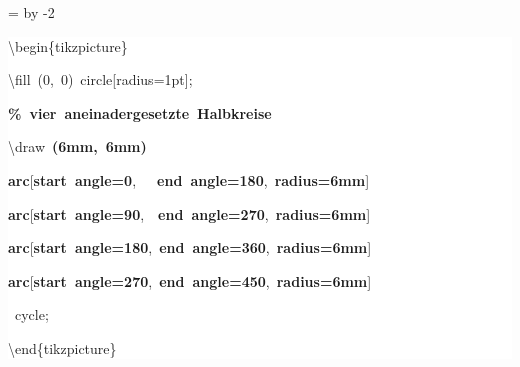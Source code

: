 \begingroup
\ttfamily
{}
=\textwidth
\advance{} by -2\fboxsep
\noindent
\colorbox{background}
{%
\parbox{\dimen255}
{%
\rule[-0.5ex]{0pt}{2.5ex}\hspace*{0.0em}\textbackslash{}begin\{tikzpicture\}\\
\rule[-0.5ex]{0pt}{2.5ex}\hspace*{1.0em}\textbackslash{}fill~(0,~0)~circle[radius=1pt];\\
\rule[-0.5ex]{0pt}{2.5ex}\hspace*{1.0em}\textcolor{G}{\textbf{\%~vier~aneinadergesetzte~Halbkreise}}\\
\rule[-0.5ex]{0pt}{2.5ex}\hspace*{1.0em}\textbackslash{}draw~\textcolor{R}{\textbf{(6mm,~6mm)}}\\
\rule[-0.5ex]{0pt}{2.5ex}\hspace*{4.0em}\textcolor{R}{\textbf{arc}}[\textcolor{R}{\textbf{start~angle=0}},~~~\textcolor{R}{\textbf{end~angle=180}},~\textcolor{R}{\textbf{radius=6mm}}]\\
\rule[-0.5ex]{0pt}{2.5ex}\hspace*{4.0em}\textcolor{R}{\textbf{arc}}[\textcolor{R}{\textbf{start~angle=90}},~~\textcolor{R}{\textbf{end~angle=270}},~\textcolor{R}{\textbf{radius=6mm}}]\\
\rule[-0.5ex]{0pt}{2.5ex}\hspace*{4.0em}\textcolor{R}{\textbf{arc}}[\textcolor{R}{\textbf{start~angle=180}},~\textcolor{R}{\textbf{end~angle=360}},~\textcolor{R}{\textbf{radius=6mm}}]\\
\rule[-0.5ex]{0pt}{2.5ex}\hspace*{4.0em}\textcolor{R}{\textbf{arc}}[\textcolor{R}{\textbf{start~angle=270}},~\textcolor{R}{\textbf{end~angle=450}},~\textcolor{R}{\textbf{radius=6mm}}]\\
\rule[-0.5ex]{0pt}{2.5ex}\hspace*{4.0em}{-}{-}~cycle;\\
\rule[-0.5ex]{0pt}{2.5ex}\hspace*{0.0em}\textbackslash{}end\{tikzpicture\}}%
}%
\endgroup
